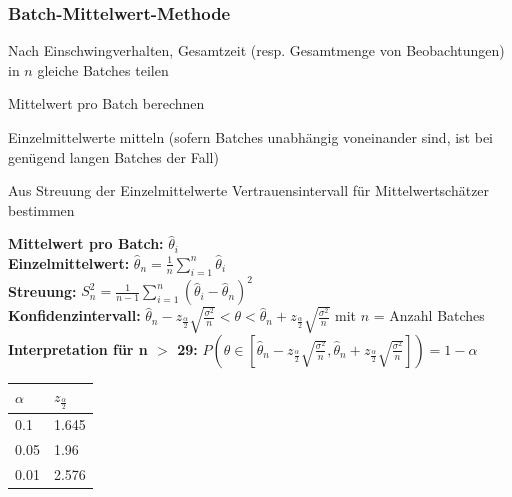 \subsubsection{Batch-Mittelwert-Methode}
\begin{compactenum}
	\item Nach Einschwingverhalten, Gesamtzeit (resp. Gesamtmenge von Beobachtungen) in $n$ gleiche Batches teilen
	\item Mittelwert pro Batch berechnen
	\item Einzelmittelwerte mitteln (sofern Batches unabhängig voneinander sind, ist bei genügend langen Batches der Fall)
	\item Aus Streuung der Einzelmittelwerte Vertrauensintervall für Mittelwertschätzer bestimmen
\end{compactenum}
\begin{minipage}[h]{0.8\textwidth}
	\textbf{Mittelwert pro Batch:} $\hat{\theta}_i$\\
	\textbf{Einzelmittelwert:} $\hat{\theta}_n=\frac{1}{n}\sum_{i=1}^{n}\hat{\theta}_i$\\
	\textbf{Streuung:} $S_n^2=\frac{1}{n-1}\sum_{i=1}^{n}(\hat{\theta}_i-\hat{\theta}_n)^2$ \\
	\textbf{Konfidenzintervall:} $\hat{\theta}_n-z_{\frac{\alpha}{2}}\sqrt{\frac{\sigma^2}{n}} < \theta < \hat{\theta}_n+z_{\frac{\alpha}{2}}\sqrt{\frac{\sigma^2}{n}}$ mit $n$ = Anzahl Batches \\
	\textbf{Interpretation für n $>$ 29:} $P(\theta \in [\hat{\theta}_n-z_{\frac{\alpha}{2}}\sqrt{\frac{\sigma^2}{n}}, \hat{\theta}_n+z_{\frac{\alpha}{2}}\sqrt{\frac{\sigma^2}{n}}])=1-\alpha$
\end{minipage}
\begin{minipage}[h]{0.2\textwidth}
	\begin{tabular}{|l|l|}
		\hline
		$\alpha$ & $z_{\frac{\alpha}{2}}$ \\ \hline
		0.1 & 1.645 \\ \hline
		0.05 & 1.96 \\ \hline
		0.01 & 2.576 \\ \hline
	\end{tabular}
\end{minipage}	